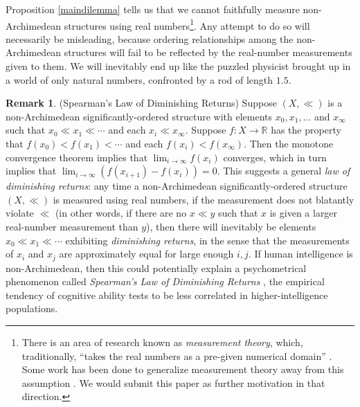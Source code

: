 \documentclass[reqno]{article}
\theoremstyle{definition}
\newtheorem{remark}[theorem]{Remark}
\begin{document}
Proposition \ref{maindilemma} tells us that we cannot faithfully measure
non-Archimedean structures using real numbers\footnote{There is an area of research
known as \emph{measurement theory}, which, traditionally,
``takes the real numbers as a pre-given numerical domain'' \cite{niederee1992numbers}.
Some work has been done to generalize measurement theory away from this assumption
\cite{narens1974} \cite{skala1975} \cite{rizza2016divergent}.
We would submit this paper as further motivation in that direction.}.
Any attempt to do so will necessarily be misleading, because ordering
relationships among the non-Archimedean structures will fail to be reflected
by the real-number measurements given to them.
We will inevitably end up like the puzzled physicist
brought up in a world of only natural numbers, confronted by a rod of
length $1.5$.

\begin{remark}
(Spearman's Law of Diminishing Returns)
Suppose $(X,\ll)$ is a non-Archimedean significantly-ordered structure
with elements $x_0,x_1,\ldots$ and $x_\infty$ such that
$x_0\ll x_1\ll\cdots$ and each $x_i\ll x_\infty$.
Suppose $f:X\to\mathbb R$ has the property that $f(x_0)<f(x_1)<\cdots$
and each $f(x_i)<f(x_\infty)$. Then the monotone convergence theorem implies
that $\lim_{i\to\infty}f(x_i)$ converges, which in turn implies that
$\lim_{i\to\infty}(f(x_{i+1})-f(x_i))=0$. This suggests a general \emph{law
of diminishing returns}: any time a non-Archimedean significantly-ordered
structure $(X,\ll)$ is measured using
real numbers, if the measurement does not blatantly violate $\ll$ (in other
words, if there are no $x\ll y$ such that $x$ is given a larger real-number
measurement than $y$), then there will inevitably be elements $x_0\ll x_1\ll \cdots$
exhibiting \emph{diminishing returns}, in the sense that the measurements of
$x_i$ and $x_j$ are approximately equal for large enough $i,j$.
If human intelligence is non-Archimedean, then this could potentially explain
a psychometrical phenomenon called \emph{Spearman's Law of Diminishing Returns}
\cite{spearman1927abilities} \cite{blum2017spearman}
\cite{hernandez2019ai}, the empirical
tendency of cognitive ability tests to be less correlated in
higher-intelligence populations.
\end{remark}
\end{document}
